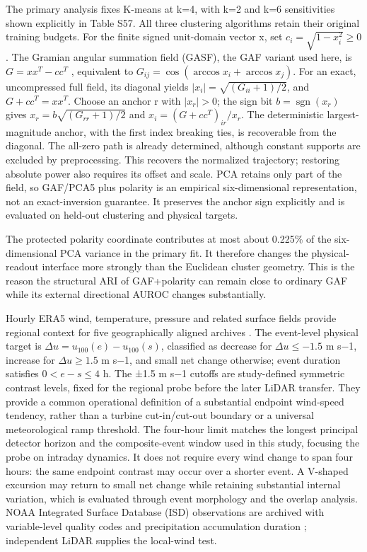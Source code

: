 \documentclass[a4paper,11pt]{article}
\begin{document}
The primary analysis fixes K-means at k=4, with k=2 and k=6 sensitivities shown explicitly in Table S57. All three clustering algorithms retain their original training budgets. For the finite signed unit-domain vector x, set \(c_i=\sqrt{1-x_i^2}\ge0\). The Gramian angular summation field (GASF), the GAF variant used here, is \(G=xx^T-cc^T\) \citep{wang2015gaf}, equivalent to \(G_{ij}=\cos(\arccos x_i+\arccos x_j)\). For an exact, uncompressed full field, its diagonal yields \(|x_i|=\sqrt{(G_{ii}+1)/2}\), and \(G+cc^T=xx^T\). Choose an anchor r with \(|x_r|>0\); the sign bit \(b=\operatorname{sgn}(x_r)\) gives \(x_r=b\sqrt{(G_{rr}+1)/2}\) and \(x_i=(G+cc^T)_{ir}/x_r\). The deterministic largest-magnitude anchor, with the first index breaking ties, is recoverable from the diagonal. The all-zero path is already determined, although constant supports are excluded by preprocessing. This recovers the normalized trajectory; restoring absolute power also requires its offset and scale. PCA retains only part of the field, so GAF/PCA5 plus polarity is an empirical six-dimensional representation, not an exact-inversion guarantee. It preserves the anchor sign explicitly and is evaluated on held-out clustering and physical targets.

The protected polarity coordinate contributes at most about 0.225\% of the six-dimensional PCA variance in the primary fit. It therefore changes the physical-readout interface more strongly than the Euclidean cluster geometry. This is the reason the structural ARI of GAF+polarity can remain close to ordinary GAF while its external directional AUROC changes substantially.

Hourly ERA5 wind, temperature, pressure and related surface fields provide regional context for five geographically aligned archives \citep{hersbach2020, era5docs}. The event-level physical target is \(\Delta u=u_{100}(e)-u_{100}(s)\), classified as decrease for \(\Delta u\le-1.5\) m s−1, increase for \(\Delta u\ge1.5\) m s−1, and small net change otherwise; event duration satisfies \(0<e-s\le4\) h. The ±1.5 m s−1 cutoffs are study-defined symmetric contrast levels, fixed for the regional probe before the later LiDAR transfer. They provide a common operational definition of a substantial endpoint wind-speed tendency, rather than a turbine cut-in/cut-out boundary or a universal meteorological ramp threshold. The four-hour limit matches the longest principal detector horizon and the composite-event window used in this study, focusing the probe on intraday dynamics. It does not require every wind change to span four hours: the same endpoint contrast may occur over a shorter event. A V-shaped excursion may return to small net change while retaining substantial internal variation, which is evaluated through event morphology and the overlap analysis. NOAA Integrated Surface Database (ISD) observations are archived with variable-level quality codes and precipitation accumulation duration \citep{noaaisd}; independent LiDAR supplies the local-wind test.
\end{document}
